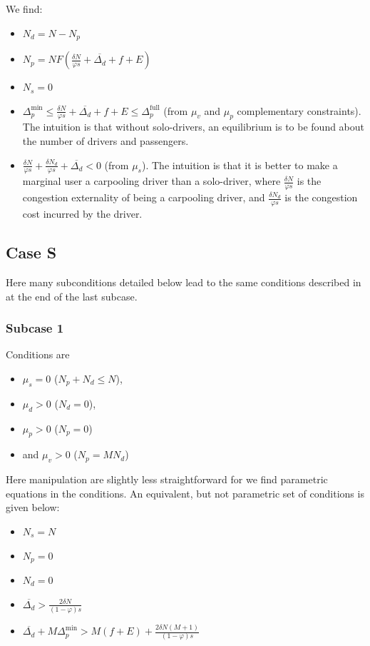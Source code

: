 \documentclass[english, a4paper]{article}
\theoremstyle{plain}
\theoremstyle{definition}
\theoremstyle{remark}
\begin{document}
We find:
\begin{itemize}
    \item $N_d = N - N_p$
    \item $N_p = NF\left( \frac{\delta N}{\varphi s} + \overline{\Delta_d} + f + E \right)$
    \item $N_s = 0$
    \item $\Delta_p^{\text{min}}\leq \frac{\delta N}{\varphi s} + \overline{\Delta_d} + f + E \leq \Delta_p^{\text{full}}$ (from $\mu_v$ and $\mu_p$ complementary constraints). The intuition is that without solo-drivers, an equilibrium is to be found about the number of drivers and passengers.
    \item $\frac{\delta N}{\varphi s} + \frac{\delta N_d}{\varphi s} + \overline{\Delta_d} <0$ (from $\mu_s$). The intuition is that it is better to make a marginal user a carpooling driver than a solo-driver, where $\frac{\delta N}{\varphi s}$ is the congestion externality of being a carpooling driver, and $\frac{\delta N_d}{\varphi s}$ is the congestion cost incurred by the driver.
\end{itemize}

\subsection{Case S}
Here many subconditions detailed below lead to the same conditions described in at the end of the last subcase.

\subsubsection{Subcase 1}

Conditions are
\begin{itemize}
    \item $\mu_s = 0$ ($N_p + N_d \leq N$),
    \item $\mu_d > 0$ ($N_d = 0$),
    \item $\mu_p > 0$ ($N_p = 0$)
    \item and $\mu_v > 0$ ($N_p = MN_d$)
\end{itemize}

Here manipulation are slightly less straightforward for we find parametric equations in the conditions. An equivalent, but not parametric set of conditions is given below:

\begin{itemize}
    \item $N_s = N$
    \item $N_p = 0$
    \item $N_d = 0$
    \item $\overline{\Delta_d} > \frac{2\delta N }{(1 - \varphi)s}$
    \item $\overline{\Delta_d} + M \Delta_p^{\text{min}} > M(f+ E) + \frac{2\delta N (M+1)}{(1 - \varphi) s}$
\end{itemize}
\end{document}
